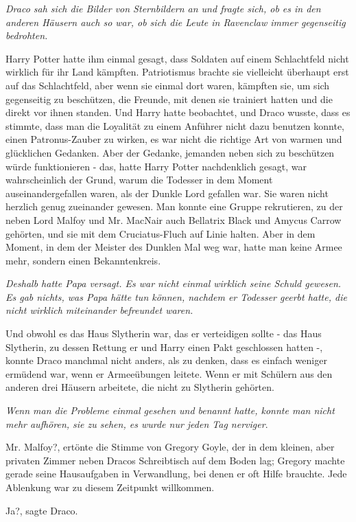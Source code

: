 \emph{Draco sah sich die Bilder von Sternbildern an und fragte sich, ob es in
den anderen Häusern auch so war, ob sich die Leute in Ravenclaw immer
gegenseitig bedrohten.}

Harry Potter hatte ihm einmal gesagt, dass Soldaten auf einem Schlachtfeld nicht
wirklich für ihr Land kämpften. Patriotismus brachte sie vielleicht überhaupt
erst auf das Schlachtfeld, aber wenn sie einmal dort waren, kämpften sie, um
sich gegenseitig zu beschützen, die Freunde, mit denen sie trainiert hatten und
die direkt vor ihnen standen. Und Harry hatte beobachtet, und Draco wusste, dass
es stimmte, dass man die Loyalität zu einem Anführer nicht dazu benutzen konnte,
einen Patronus-Zauber zu wirken, es war nicht die richtige Art von warmen und
glücklichen Gedanken. Aber der Gedanke, jemanden neben sich zu beschützen würde
funktionieren - das, hatte Harry Potter nachdenklich gesagt, war wahrscheinlich
der Grund, warum die Todesser in dem Moment auseinandergefallen waren, als der
Dunkle Lord gefallen war. Sie waren nicht herzlich genug zueinander gewesen. Man
konnte eine Gruppe rekrutieren, zu der neben Lord Malfoy und Mr. MacNair auch
Bellatrix Black und Amycus Carrow gehörten, und sie mit dem Cruciatus-Fluch auf
Linie halten. Aber in dem Moment, in dem der Meister des Dunklen Mal weg war,
hatte man keine Armee mehr, sondern einen Bekanntenkreis.

\emph{Deshalb hatte Papa versagt. Es war nicht einmal wirklich seine Schuld
gewesen. Es gab nichts, was Papa hätte tun können, nachdem er Todesser geerbt
hatte, die nicht wirklich miteinander befreundet waren.}

Und obwohl es das Haus Slytherin war, das er verteidigen sollte - das Haus
Slytherin, zu dessen Rettung er und Harry einen Pakt geschlossen hatten -,
konnte Draco manchmal nicht anders, als zu denken, dass es einfach weniger
ermüdend war, wenn er Armeeübungen leitete. Wenn er mit Schülern aus den anderen
drei Häusern arbeitete, die nicht zu Slytherin gehörten.

\emph{Wenn man die Probleme einmal gesehen und benannt hatte, konnte man nicht
mehr aufhören, sie zu sehen, es wurde nur jeden Tag nerviger}.

\glqq{}Mr. Malfoy?\grqq{}, ertönte die Stimme von Gregory Goyle, der in dem
kleinen, aber privaten Zimmer neben Dracos Schreibtisch auf dem Boden lag;
Gregory machte gerade seine Hausaufgaben in Verwandlung, bei denen er oft Hilfe
brauchte. Jede Ablenkung war zu diesem Zeitpunkt willkommen.

\glqq{}Ja?\grqq{}, sagte Draco.

